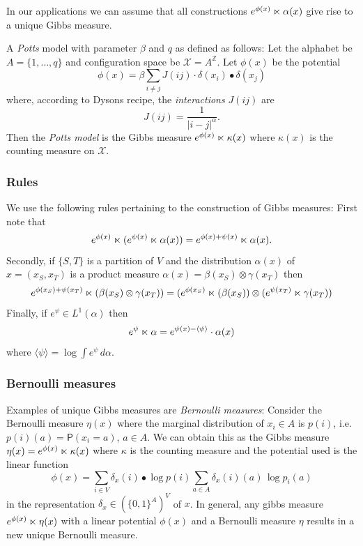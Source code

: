 \documentclass[11pt, a4paper, oneside]{article}
\theoremstyle{definition}
\theoremstyle{remark}
\renewcommand{\d}{\,d}
\providecommand{\ZZ}{\mathbb{Z}}
\providecommand{\mscr}{\mathscr}
\renewcommand{\P}{\mathsf{P}}
\def\X{\mscr X}
\begin{document}
In our applications we can assume that all constructions
$e^{\phi(x)}\ltimes \alpha(x)$ give rise to a unique Gibbs measure.

A \emph{Potts} model with parameter $\beta$ and $q$ as defined as follows: Let
the alphabet be $A=\{1,\dots,q\}$ and configuration space be $\X=A^\ZZ$. Let
$\phi(x)$ be the potential
\begin{equation} \label{eq:Potts}
  \phi(x)=\beta \sum_{i\not=j} J(ij) \cdot \delta(x_i) \bullet \delta(x_j)
\end{equation}
where, according to Dysons recipe, the \emph{interactions} $J(ij)$ are
\begin{equation} \label{eq:Dyson}
  J(ij)=\frac1{|i-j|^\alpha}.
\end{equation}
Then the \emph{Potts model} is the Gibbs measure $e^{\phi(x)}\ltimes\kappa(x)$
where $\kappa(x)$ is the counting measure on $\X$.

\subsubsection{Rules}
We use the following rules pertaining to the construction of Gibbs measures:
First note that
\begin{equation}\label{eq:additive}
  e^{\phi(x)} \ltimes (e^{\psi(x)} \ltimes \alpha(x))
  = e^{\phi(x)+\psi(x)} \ltimes \alpha(x).
\end{equation}
Secondly, if $\{S,T\}$ is a partition of $V$ and the distribution $\alpha(x)$ of
$x=(x_{S},x_{T})$ is a product measure
$\alpha(x) = \beta(x_{S}) \otimes \gamma({x_{T}})$ then
\begin{equation}\label{eq:product}
  e^{\phi(x_{S})+\psi(x_{T})} \ltimes (\beta(x_S) \otimes \gamma(x_T)) =
  (e^{\phi(x_{S})} \ltimes (\beta(x_S)) \otimes (e^{\psi(x_T)}\ltimes \gamma(x_T))
\end{equation}
Finally, if $e^\psi\in L^1(\alpha)$ then
\begin{equation}\label{eq:normalisation}
  e^{\psi}  \ltimes \alpha = e^{\psi(x) - \langle\psi\rangle} \cdot \alpha(x)
\end{equation}
where $\langle \psi \rangle = \log \int e^{\psi}\d\alpha$.


\subsubsection{Bernoulli measures}
Examples of unique Gibbs measures are \emph{Bernoulli measures}: Consider the
Bernoulli measure $\eta(x)$ where the marginal distribution of $x_i\in A$ is
$p(i)$, i.e. $p(i)(a)=\P(x_i=a)$, $a\in A$. We can obtain this as the Gibbs
measure $\eta(x)=e^{\phi(x)} \ltimes \kappa(x)$ where $\kappa$ is the counting
measure and the potential used is the linear function
$$ \phi(x) = \sum_{i\in V} \delta_x(i) \bullet \log p(i)\sum_{a\in A} \delta_x(i)(a)\,\log p_i(a) $$
in the representation $\delta_x \in (\{0,1\}^A)^V$ of $x$. In general, any
gibbs measure $e^{\phi(x)}\ltimes \eta(x)$ with a linear potential $\phi(x)$ and
a Bernoulli measure $\eta$ results in a new unique Bernoulli measure.
\end{document}
